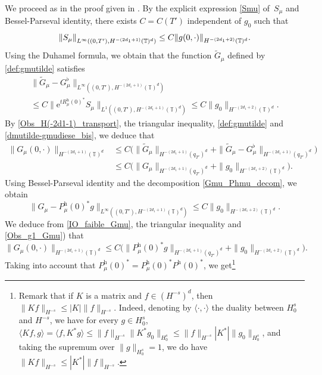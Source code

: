 \documentclass[JEP,XML,SOM,Unicode,NoEqCountersInSection]{cedram}
\theoremstyle{plain}
\theoremstyle{definition}
\theoremstyle{remark}
\newcommand{\norme}[1]{\left\lVert#1\right\rVert}
\newcommand{\set}{\mathbb}
\newcommand{\T}{\set{T}}
\newcommand{\h}{{\mathrm h}}
\newcommand{\eu}{\mathrm e}
\let\originalleft\left
\let\originalright\right
\renewcommand{\left}{\mathopen{}\mathclose\bgroup\originalleft}
\renewcommand{\right}{\aftergroup\egroup\originalright}
\begin{document}
We proceed as in the proof given in .
By the explicit expression \eqref{Smu} of~$S_\mu$ and Bessel-Parseval identity, there exists $C=C(T')$ independent of $g_0$ such that
\begin{equation}
\label{defsourcecompBis}
\norme{S_\mu}_{L^\infty((0,T'),H^{-(2d_1+1)}(\T)^d)} \leq C \norme{ g(0,\cdot)}_{H^{-(2d_1+2)}(\T)^d}.
\end{equation}
Using the Duhamel formula, we obtain that the function $\widetilde{G}_\mu$ defined by \eqref{def:gmutilde} satisfies
\begin{multline}
\| \widetilde{G}_\mu - G_\mu^\flat \|_{L^\infty((0,T'),H^{-(2d_1+1)}(\T)^d)}\\
\leq C \| \eu^{t R_{\mu}^{\h}(0)^*} S_\mu \|_{L^1((0,T'),H^{-(2d_1+1)}(\T)^d)} \leq C
\| g_0 \|_{H^{-(2d_1+2)}(\T)^d}.
\label{dmutilde-gmudiese_bis}
\end{multline}
By \eqref{Obs_H(-2d1-1)_transport}, the triangular inequality, \eqref{def:gmutilde} and \eqref{dmutilde-gmudiese_bis}, we deduce that
\begin{equation} \label{IO_faible_Gmu}
\begin{aligned}
\| G_\mu(0,\cdot) \|_{H^{-(2d_1+1)}(\T)^d}
& \leq C \bigl(\| \widetilde{G}_\mu \|_{H^{-(2d_1+1)}(q_{T'})^d} + \| \widetilde{G}_\mu - G_\mu^\flat \|_{H^{-(2d_1+1)}(q_{T'})^d} \bigr) \\
& \leq C \bigl(\|G_\mu\|_{H^{-(2d_1+1)}(q_{T'})^d}+ \| g_0 \|_{H^{-(2d_1+2)}(\T)^d}
\bigr).
\end{aligned}
\end{equation}
Using Bessel-Parseval identity and the decomposition \eqref{Gmu_Phmu_decom}, we obtain
\begin{equation} \label{Obs_g1_Gmu}
\|G_{\mu} -P^\h_\mu(0)^* g \|_{L^\infty((0,T'),H^{-(2d_1+1)}(\T)^d)} \leq C \| g_0\|_{H^{-(2d_1+2)}(\T)^d}.
\end{equation}
We deduce from \eqref{IO_faible_Gmu}, the triangular inequality and \eqref{Obs_g1_Gmu}) that
\[
\| G_\mu(0,\cdot) \|_{H^{-(2d_1+1)}(\T)^d} \leq C \bigl(
\| P^\h_\mu(0)^* g \|_{H^{-(2d_1+1)}(q_{T'})^d} + \| g_0\|_{H^{-(2d_1+2)}(\T)^d} \bigr).
\]
Taking into account that $P^\h_\mu(0)^*=P^\h_\mu(0)^* P^\h(0)^*$, we get\footnote{Remark that if $K$ is a matrix and $f\in (H^{-s})^d$, then $\|Kf\|_{H^{-s}}\leq |K|\|f\|_{H^{-s}}$. Indeed, denoting by $\langle\cdot,\cdot\rangle$ the duality between $H^s_0$ and $H^{-s}$, we have for every $g\in H^{s}_0$, $\langle Kf,g\rangle = \langle f, K^*g\rangle\leq \|f\|_{H^{-s}} \|K^* g_0\|_{H^s_0}\leq\|f\|_{H^{-s}}|K^*| \| g_0\|_{H^s_0} $, and taking the supremum over $\|g\|_{H^s_0} = 1$, we do have $\|Kf\|_{H^{-s}}\leq |K^*|\|f\|_{H^{-s}}$.}
\end{document}
